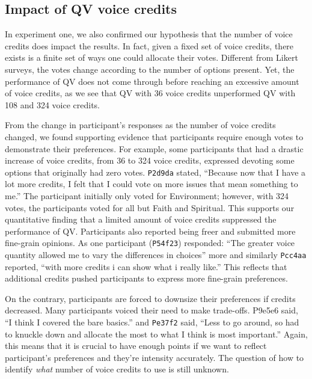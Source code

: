 \subsection{Impact of QV voice credits}
In experiment one, we also confirmed our hypothesis that the number of voice credits does impact the results. 
In fact, given a fixed set of voice credits, there exists is a finite set of ways one could allocate their votes. 
Different from Likert surveys, the votes change according to the number of options present.
Yet, the performance of QV does not come through before reaching an excessive amount of voice credits, as we see that QV with 36 voice credits unperformed QV with 108 and 324 voice credits.

From the change in participant's responses as the number of voice credits changed, we found supporting evidence that participants require enough votes to demonstrate their preferences.
For example, some participants that had a drastic increase of voice credits, from 36 to 324 voice credits, expressed devoting some options that originally had zero votes. 
\texttt{P2d9da} stated, ``Because now that I have a lot more credits, I felt that I could vote on more issues that mean something to me.'' The participant initially only voted for Environment; however, with 324 votes, the participants voted for all but Faith and Spiritual. This supports our quantitative finding that a limited amount of voice credits suppressed the performance of QV. Participants also reported being freer and submitted more fine-grain opinions. As one participant (\texttt{P54f23}) responded: ``The greater voice quantity allowed me to vary the differences in choices'' more and similarly \texttt{Pcc4aa} reported, ``with more credits i can show what i really like.''
This reflects that additional credits pushed participants to express more fine-grain preferences.

On the contrary, participants are forced to downsize their preferences if credits decreased. Many participants voiced their need to make trade-offs. P9e5e6 said, ``I think I covered the bare basics.'' and \texttt{Pe37f2} said, ``Less to go around, so had to knuckle down and allocate the most to what I think is most important.'' 
Again, this means that it is crucial to have enough points if we want to reflect participant's preferences and they're intensity accurately.
The question of how to identify \textit{what} number of voice credits to use is still unknown.

